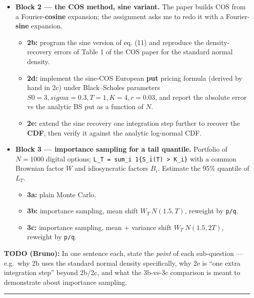 \documentclass[
  11pt,
]{article}
\providecommand{\tightlist}{%
  \setlength{\itemsep}{0pt}\setlength{\parskip}{0pt}}
\begin{document}
\begin{itemize}
\tightlist
\item
  \textbf{Block 2 --- the COS method, sine variant.} The paper builds
  COS from a Fourier-\textbf{cosine} expansion; the assignment asks me
  to redo it with a Fourier-\textbf{sine} expansion.

  \begin{itemize}
  \tightlist
  \item
    \textbf{2b:} program the sine version of eq. (11) and reproduce the
    density-recovery errors of Table 1 of the COS paper for the standard
    normal density.
  \item
    \textbf{2d:} implement the sine-COS European \textbf{put} pricing
    formula (derived by hand in 2c) under Black--Scholes parameters
    \(S0=3, sigma=0.3, T=1, K=4, r=0.03\), and report the absolute error
    vs the analytic BS put as a function of \(N\).
  \item
    \textbf{2e:} extend the sine recovery one integration step further
    to recover the \textbf{CDF}, then verify it against the analytic
    log-normal CDF.
  \end{itemize}
\item
  \textbf{Block 3 --- importance sampling for a tail quantile.}
  Portfolio of \(N=1000\) digital options;
  \texttt{L\_T\ =\ sum\_i\ 1\{S\_i(T)\ \textgreater{}\ K\_i\}} with a
  common Brownian factor \(W\) and idiosyncratic factors \(B_i\).
  Estimate the 95\% quantile of \(L_T\).

  \begin{itemize}
  \tightlist
  \item
    \textbf{3a:} plain Monte Carlo.
  \item
    \textbf{3b:} importance sampling, mean shift \(W_T ~ N(1.5, T)\),
    reweight by \texttt{p/q}.
  \item
    \textbf{3c:} importance sampling, mean + variance shift
    \(W_T ~ N(1.5, 2T)\), reweight by \texttt{p/q}.
  \end{itemize}
\end{itemize}

\textbf{TODO (Bruno):} In one sentence each, state the \emph{point} of
each sub-question --- e.g.~why 2b uses the standard normal density
specifically, why 2e is ``one extra integration step'' beyond 2b/2c, and
what the 3b-vs-3c comparison is meant to demonstrate about importance
sampling.

\begin{center}\rule{0.5\linewidth}{0.5pt}\end{center}
\end{document}
